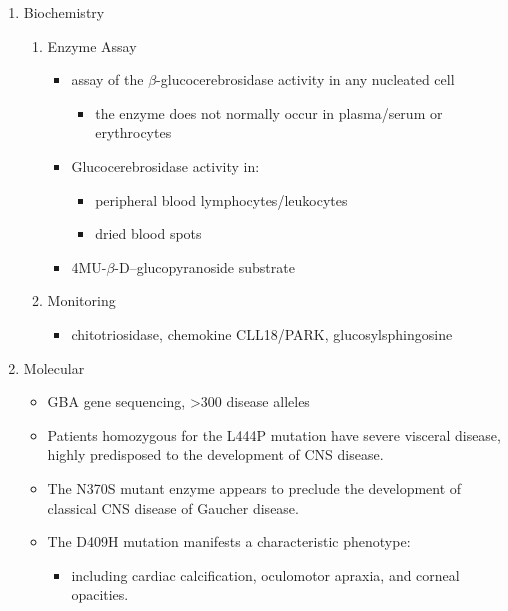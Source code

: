 \documentclass{scrartcl}
\begin{document}
\begin{enumerate}
\begin{enumerate}
\item Biochemistry
\label{sec:orgdf911e1}
\begin{enumerate}
\item Enzyme Assay
\label{sec:orge5ad09a}
\begin{itemize}
\item assay of the \(\beta\)-glucocerebrosidase activity in any nucleated cell
\begin{itemize}
\item the enzyme does not normally occur in plasma/serum or erythrocytes
\end{itemize}
\item Glucocerebrosidase activity in:
\begin{itemize}
\item peripheral blood lymphocytes/leukocytes
\item dried blood spots
\end{itemize}
\item 4MU-\(\beta\)-D--glucopyranoside substrate
\end{itemize}

\item Monitoring
\label{sec:org1d0b90c}
\begin{itemize}
\item chitotriosidase, chemokine CLL18/PARK, glucosylsphingosine
\end{itemize}
\end{enumerate}

\item Molecular
\label{sec:orgba1c72c}
\begin{itemize}
\item GBA gene sequencing, >300 disease alleles
\item Patients homozygous for the L444P mutation have severe visceral
disease, highly predisposed to the development of CNS disease.
\item The N370S mutant enzyme appears to preclude the development of classical CNS disease of Gaucher disease.
\item The D409H mutation manifests a characteristic phenotype:
\begin{itemize}
\item including cardiac calcification, oculomotor apraxia, and corneal opacities.
\end{itemize}
\end{itemize}
\end{enumerate}


\end{enumerate}
\end{document}

